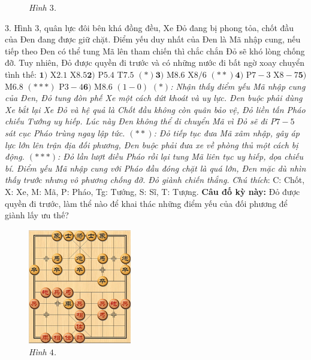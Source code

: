 \begin{multicols}{2}
\begin{figure}[H]
		\caption{\small\textit{\color{gocco}Hình $3$.}}
		\vspace*{-10pt}
	\end{figure}
	$3.$ Hình $3$, quân lực đôi bên khá đồng đều, Xe Đỏ đang bị phong tỏa, chốt đầu của Đen đang được giữ chặt. Điểm yếu duy nhất của Đen là Mã nhập cung, nếu tiếp theo Đen có thể tung Mã lên tham chiến thì chắc chắn Đỏ sẽ khó lòng chống đỡ. Tuy nhiên, Đỏ được quyền đi trước và có những nước đi bất ngờ xoay chuyển tình thế:
	\vskip 0.1cm
	$\pmb{1)}$	X$2.1$ X$8.5$\quad  $\pmb{2)}$ P$5.4$ T$7.5$ $(*)$\quad $\pmb{3)}$ M$8.6$ X$8/6$ $(**)$\quad $\pmb{4)}$ P$7-3$ X$8-7$\quad $\pmb{5)}$ M$6.8$ $(***)$ P$3-4$\quad $\pmb{6)}$ M$8.6$ $(1-0)$
	\vskip 0.1cm
	\textit{$(*)$: Nhận thấy điểm yếu Mã nhập cung của Đen, Đỏ tung đòn phế Xe một cách dứt khoát và uy lực. Đen buộc phải dùng Xe bắt lại Xe Đỏ và hệ quả là Chốt đầu không còn quân bảo vệ, Đỏ liền tấn Pháo chiếu Tướng uy hiếp. Lúc này Đen không thể di chuyển Mã vì Đỏ sẽ đi P$7-5$ sát cục Pháo trùng ngay lập tức.
	\vskip 0.1cm
	$(**)$: Đỏ tiếp tục đưa Mã xâm nhập, gây áp lực lớn lên trận địa đối phương, Đen buộc phải đưa xe về phòng thủ một cách bị động.
	\vskip 0.1cm
	$(***)$: Đỏ lần lượt điều Pháo rồi lại tung Mã liên tục uy hiếp, dọa chiếu bí. Điểm yếu Mã nhập cung với Pháo đầu đóng chặt là quá lớn, Đen mặc dù nhìn thấy trước nhưng vô phương chống đỡ. Đỏ giành chiến thắng.}
	\vskip 0.1cm
	\textit{Chú thích}: C: Chốt, X: Xe, M: Mã, P: Pháo, Tg: Tướng, S: Sĩ, T: Tượng. 
	\vskip 0.1cm
	\textbf{\color{gocco}Câu đố kỳ này:} Đỏ được quyền đi trước, làm thể nào để khai thác những điểm yếu của đối phương để giành lấy ưu thế?
	\begin{figure}[H]
		\vspace*{-5pt}
		\centering
		\captionsetup{labelformat= empty, justification=centering}
		\includegraphics[width= 0.4\textwidth]{4}
		\caption{\small\textit{\color{gocco}Hình $4$.}}
		\vspace*{-10pt}
	\end{figure}

\end{multicols}
